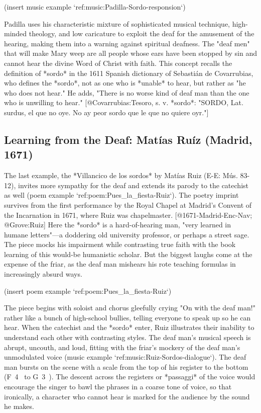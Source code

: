 (insert music example `ref:music:Padilla-Sordo-responsion`)
\label{music:Padilla-Sordo-responsion}

Padilla uses his characteristic mixture of sophisticated musical technique,
high-minded theology, and low caricature to exploit the deaf for the amusement
of the hearing, making them into a warning against spiritual deafness.
The "deaf men" that will make Mary weep are all people whose ears have
been stopped by sin and cannot hear the divine Word of Christ with faith. 
This concept recalls the definition of *sordo* in the 1611 Spanish dictionary of
Sebastián de Covarrubias, who defines the *sordo*, not as one who is *unable* to
hear, but rather as "he who does not hear." 
He adds, "There is no worse kind of deaf man than the one who is unwilling to
hear." 
[@Covarrubias:Tesoro, s. v. *sordo*: "SORDO, Lat. surdus, el que no oye. No ay
peor sordo que le que no quiere oyr."]


\subsection{Learning from the Deaf: Matías Ruíz (Madrid, 1671)}

The last example, the *Villancico de los sordos* by Matías Ruiz (E-E: Mús.
83-12), invites more sympathy for the deaf and extends its parody to the
catechist as well (poem example `ref:poem:Pues_la_fiesta-Ruiz`). 
The poetry imprint survives from the first performance by the Royal Chapel at
Madrid's Convent of the Incarnation in 1671, where Ruiz was chapelmaster.
[@1671-Madrid-Enc-Nav; @Grove:Ruiz]
Here the *sordo* is a hard-of-hearing man, "very learned in humane letters"---a
doddering old university professor, or perhaps a street sage. 
The piece mocks his impairment while contrasting true faith with the book
learning of this would-be humanistic scholar. 
But the biggest laughs come at the expense of the friar, as the deaf man
mishears his rote teaching formulas in increasingly absurd ways.

(insert poem example `ref:poem:Pues_la_fiesta-Ruiz`)
\label{poem:Pues_la_fiesta-Ruiz}

The piece begins with soloist and chorus gleefully crying "On with the deaf
man!" rather like a bunch of high-school bullies, telling everyone to speak up
so he can hear. 
When the catechist and the *sordo* enter, Ruiz illustrates their inability to
understand each other with contrasting styles. 
The deaf man's musical speech is abrupt, uncouth, and loud, fitting with the
friar's mockery of the deaf man's unmodulated voice 
(music example `ref:music:Ruiz-Sordos-dialogue`). 
The deaf man bursts on the scene with a scale from the top of his register to
the bottom (F~4~ to G~3~). 
The descent across the registers or *passaggi* of the voice would encourage the
singer to bawl the phrases in a coarse tone of voice, so that ironically, a
character who cannot hear is marked for the audience by the sound he makes.

